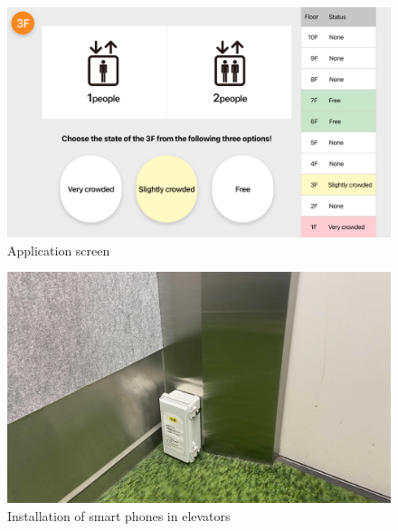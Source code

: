 \begin{figure}[t]
\begin{center}
\includegraphics[clip,  width=1.0\hsize]{img/application_sceen.png}
\caption{Application screen}
\label{fig:application_sceen}
\end{center}
\end{figure}

\begin{figure}[t]
\begin{center}
\includegraphics[clip,  width=1.0\hsize]{img/kyudai_west2_elevator_inside.jpg}
\caption{Installation of smart phones in elevators}
\label{fig:kyudai_west2_elevator_inside}
\end{center}
\end{figure}

